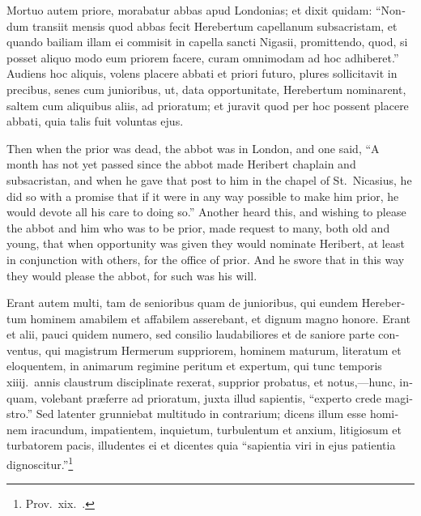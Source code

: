 \documentclass{book}
\begin{document}
\begin{paracol}{2}
\switchcolumn*

\begin{otherlanguage}{latin}
Mortuo autem priore, morabatur abbas apud Londonias; et dixit quidam: ``Nondum transiit mensis quod abbas fecit Herebertum capellanum subsacristam, et quando bailiam illam ei commisit in capella sancti Nigasii, promittendo, quod, si posset aliquo modo eum priorem facere, curam omnimodam ad hoc adhiberet.'' Audiens hoc aliquis, volens placere abbati et priori futuro, plures sollicitavit in precibus, senes cum junioribus, ut, data opportunitate, Herebertum nominarent, saltem cum aliquibus aliis, ad prioratum; et juravit quod per hoc possent placere abbati, quia talis fuit voluntas ejus.
\end{otherlanguage}

\switchcolumn

Then when the prior was dead, the abbot was in London, and one said, ``A month has not yet passed since the abbot made Heribert chaplain and subsacristan, and when he gave that post to him in the chapel of St.\ Nicasius, he did so with a promise that if it were in any way possible to make him prior, he would devote all his care to doing so.'' Another heard this, and wishing to please the abbot and him who was to be prior, made request to many, both old and young, that when opportunity was given they would nominate Heribert, at least in conjunction with others, for the office of prior. And he swore that in this way they would please the abbot, for such was his will.

\switchcolumn*

\begin{otherlanguage}{latin}
Erant autem multi, tam de senioribus quam de junioribus, qui eundem Herebertum hominem amabilem et affabilem asserebant, et dignum magno honore. Erant et alii, pauci quidem numero, sed consilio laudabiliores et de saniore parte conventus, qui magistrum Hermerum suppriorem, hominem maturum, literatum et eloquentem, in animarum regimine peritum et expertum, qui tunc temporis xiiij.\ annis claustrum disciplinate rexerat, supprior probatus, et notus,---hunc, inquam, volebant pr\ae{}ferre ad prioratum, juxta illud sapientis, ``experto crede magistro.'' Sed latenter grunniebat multitudo in contrarium; dicens illum esse hominem iracundum, impatientem, inquietum, turbulentum et anxium, litigiosum et turbatorem pacis, illudentes ei et dicentes quia ``sapientia viri in ejus patientia dignoscitur.''\footnote[\textdagger]{Prov.\ xix.\ .}
\end{otherlanguage}


\end{paracol}
\end{document}
